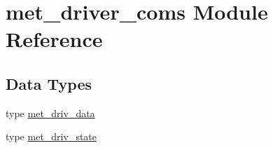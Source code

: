\hypertarget{namespacemet__driver__coms}{}\section{met\+\_\+driver\+\_\+coms Module Reference}
\label{namespacemet__driver__coms}
\subsection*{Data Types}
\begin{DoxyCompactItemize}
\item 
type \hyperlink{structmet__driver__coms_1_1met__driv__data}{met\+\_\+driv\+\_\+data}
\item 
type \hyperlink{structmet__driver__coms_1_1met__driv__state}{met\+\_\+driv\+\_\+state}
\end{DoxyCompactItemize}
